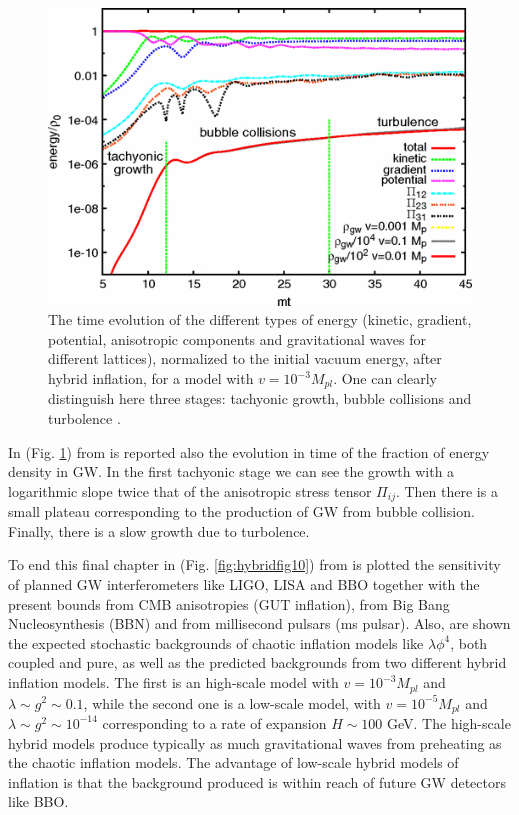 \documentclass[11pt,a4paper,twoside]{book}
\begin{document}
\begin{figure}
	\centering
	\includegraphics[width=0.65\linewidth, height=0.35\textheight]{Images/Chap7/Hybrid_Fig2}
	\caption{The time evolution of the different types of energy (kinetic, gradient, potential, anisotropic components and gravitational waves for different lattices), normalized to the initial vacuum energy, after hybrid inflation, for a model with $ v=10^{-3} M_{pl} $. One can clearly distinguish here three stages: tachyonic growth, bubble collisions and turbolence \cite{Chap7:HybridModel}. }
	\label{fig:hybridfig2}
\end{figure}


In (Fig. \ref{fig:hybridfig2})  from \cite{Chap7:HybridModel} is reported also the evolution in time of the fraction of energy density in GW. In the first tachyonic stage we can see the growth with a logarithmic slope twice that of the anisotropic stress tensor $ \Pi_{ij} $. Then there is a small plateau corresponding to the production of GW from bubble collision. Finally, there is a slow growth due to turbolence. 

To end this final chapter in (Fig. \ref{fig:hybridfig10}) from \cite{Chap7:HybridModel} is plotted the sensitivity of planned GW interferometers like LIGO, LISA and BBO together with the present bounds from CMB anisotropies (GUT inflation), from Big Bang Nucleosynthesis (BBN) and from millisecond pulsars (ms pulsar). Also, are shown the expected stochastic backgrounds of chaotic inflation models like $\lambda\phi^{4}$, both coupled and pure, as well as the predicted backgrounds from two different hybrid inflation models. The first is an high-scale model  with $ v=10^{-3} M_{pl} $ and $ \lambda \sim g^{2} \sim 0.1 $, while the second one is a low-scale model, with $ v=10^{-5} M_{pl} $ and $ \lambda \sim g^{2} \sim 10^{-14} $ corresponding to a rate of expansion $ H \sim 100 $ GeV. The high-scale hybrid models produce typically as much gravitational waves from preheating as the chaotic inflation models. The advantage of low-scale hybrid models of inflation is that the background produced is within reach of future GW detectors like BBO.
\end{document}
